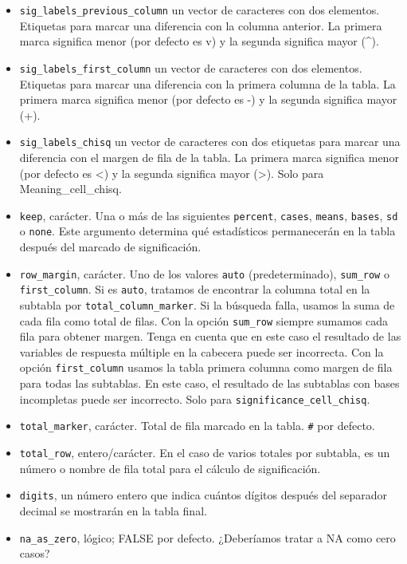 \documentclass[
]{book}
\begin{document}
\begin{itemize}
\item
  \texttt{sig\_labels\_previous\_column} un vector de caracteres con dos elementos. Etiquetas para marcar una diferencia con la columna anterior. La primera marca significa menor (por defecto es v) y la segunda significa mayor (\^{}).
\item
  \texttt{sig\_labels\_first\_column} un vector de caracteres con dos elementos. Etiquetas para marcar una diferencia con la primera columna de la tabla. La primera marca significa menor (por defecto es -) y la segunda significa mayor (+).
\item
  \texttt{sig\_labels\_chisq} un vector de caracteres con dos etiquetas para marcar una diferencia con el margen de fila de la tabla. La primera marca significa menor (por defecto es \textless) y la segunda significa mayor (\textgreater). Solo para Meaning\_cell\_chisq.
\item
  \texttt{keep}, carácter. Una o más de las siguientes \texttt{percent}, \texttt{cases}, \texttt{means}, \texttt{bases}, \texttt{sd} o \texttt{none}. Este argumento determina qué estadísticos permanecerán en la tabla después del marcado de significación.
\item
  \texttt{row\_margin}, carácter. Uno de los valores \texttt{auto} (predeterminado), \texttt{sum\_row} o \texttt{first\_column}. Si es \texttt{auto}, tratamos de encontrar la columna total en la subtabla por \texttt{total\_column\_marker}. Si la búsqueda falla, usamos la suma de cada fila como total de filas. Con la opción \texttt{sum\_row} siempre sumamos cada fila para obtener margen. Tenga en cuenta que en este caso el resultado de las variables de respuesta múltiple en la cabecera puede ser incorrecta. Con la opción \texttt{first\_column} usamos la tabla primera columna como margen de fila para todas las subtablas. En este caso, el resultado de las subtablas con bases incompletas puede ser incorrecto. Solo para \texttt{significance\_cell\_chisq}.
\item
  \texttt{total\_marker}, carácter. Total de fila marcado en la tabla. \texttt{\#} por defecto.
\item
  \texttt{total\_row}, entero/carácter. En el caso de varios totales por subtabla, es un número o nombre de fila total para el cálculo de significación.
\item
  \texttt{digits}, un número entero que indica cuántos dígitos después del separador decimal se mostrarán en la tabla final.
\item
  \texttt{na\_as\_zero}, lógico; FALSE por defecto. ¿Deberíamos tratar a NA como cero casos?

\end{itemize}
\end{document}
